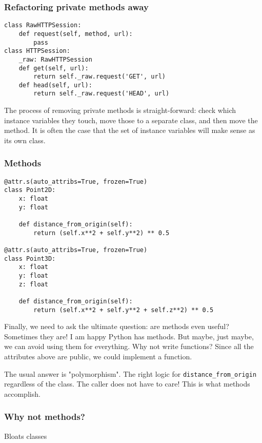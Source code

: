 \begin{frame}[fragile]
\frametitle{Refactoring private methods away}

\begin{lstlisting}
class RawHTTPSession:
    def request(self, method, url):
        pass
class HTTPSession:
    _raw: RawHTTPSession
    def get(self, url):
        return self._raw.request('GET', url)
    def head(self, url):
        return self._raw.request('HEAD', url)
\end{lstlisting}
    
\end{frame}

The process of removing private methods is straight-forward:
check which instance variables they touch,
move those to a separate class,
and then move the method.
It is often the case that the set of instance variables
will
make sense as its own class.

\begin{frame}[fragile]
\frametitle{Methods}

\begin{lstlisting}
@attr.s(auto_attribs=True, frozen=True)
class Point2D:
    x: float
    y: float

    def distance_from_origin(self):
        return (self.x**2 + self.y**2) ** 0.5

@attr.s(auto_attribs=True, frozen=True)
class Point3D:
    x: float
    y: float
    z: float

    def distance_from_origin(self):
        return (self.x**2 + self.y**2 + self.z**2) ** 0.5
\end{lstlisting}

\end{frame}

Finally,
we need to ask the ultimate question:
are methods even useful?
Sometimes they are!
I am happy Python has methods.
But maybe,
just maybe,
we can avoid using them for everything.
Why not write functions?
Since all the attributes above are public,
we could implement a function.

The usual answer is "polymorphism".
The right logic for \lstinline!distance_from_origin!
regardless of the class.
The caller does not have to care!
This is what methods accomplish.

\begin{frame}[fragile]
\frametitle{Why not methods?}

Bloats classes

\end{frame}

